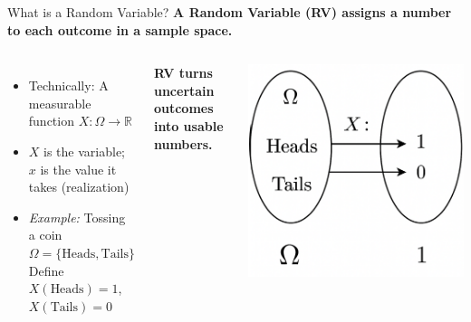 \documentclass[handout,aspectratio=169]{beamer}
\begin{document}
\begin{frame}{What is a Random Variable?}
	\textbf{A Random Variable (RV) assigns a number to each outcome in a sample space.}
	
	\vspace{1em}
	\begin{columns}
		\begin{itemize}
			\item Technically: A measurable function $X: \Omega \rightarrow \mathbb{R}$
			\item $X$ is the variable; $x$ is the value it takes (realization)
			\item \textit{Example:} Tossing a coin\\
			      \quad $\Omega = \{\text{Heads}, \text{Tails}\}$\\
			      \quad Define $X(\text{Heads}) = 1$, $X(\text{Tails}) = 0$
		\end{itemize}
		
		\vspace{0.5em}
		\textbf{RV turns uncertain outcomes into usable numbers.}
		
		\includegraphics[width=\linewidth]{figs/rv_mapping.png}
	\end{columns}
\end{frame}
\end{document}
